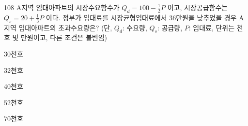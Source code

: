 \begin{question}{108}
A지역 임대아파트의 시장수요함수가 ${ Q_{ d } = 100- \frac{ 1 } { 2 } P }$ 이고, 시장공급함수는 ${ Q_{ s } = 20+ \frac{ 1 } { 3 } P }$ 이다. 정부가 임대료를 시장균형임대료에서 36만원을 낮추었을 경우 A지역 임대아파트의 초과수요량은? (단, ${ Q_{ d }}$: 수요량, ${ Q_{ s }}$: 공급량, ${ P }$: 임대료, 단위는 천호 및 만원이고, 다른 조건은 불변임)
\begin{choices}
  \item 30천호
  \item 32천호
  \item 40천호
  \item 52천호
  \item 70천호
\end{choices}
\end{question}
